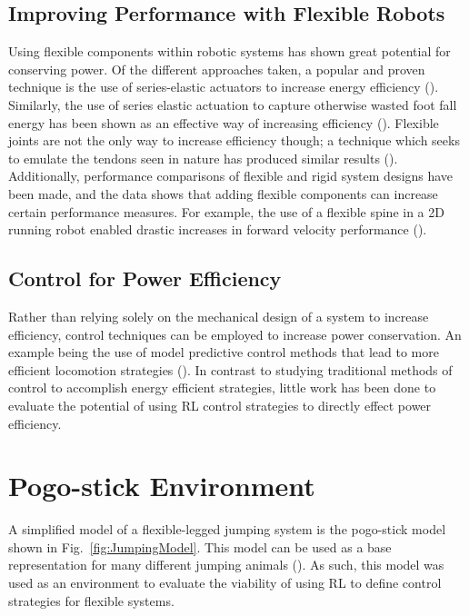 \documentclass{ifacconf}
\begin{document}
   \subsection{Improving Performance with Flexible Robots} 
      Using flexible components within robotic systems has shown great potential for conserving power. Of the different approaches taken, a popular and proven technique is the use of series-elastic actuators to increase energy efficiency (\cite{Pratt1995, Ahmadi1997}). Similarly, the use of series elastic actuation to capture otherwise wasted foot fall energy has been shown as an effective way of increasing efficiency (\cite{Seok2013, Seok2015}). Flexible joints are not the only way to increase efficiency though; a technique which seeks to emulate the tendons seen in nature has produced similar results (\cite{Folkertsma2012}). Additionally, performance comparisons of flexible and rigid system designs have been made, and the data shows that adding flexible components can increase certain performance measures. For example, the use of a flexible spine in a 2D running robot enabled drastic increases in forward velocity performance (\cite{Kani2013}). 
   
   \subsection{Control for Power Efficiency}
      Rather than relying solely on the mechanical design of a system to increase efficiency, control techniques can be employed to increase power conservation. An example being the use of model predictive control methods that lead to more efficient locomotion strategies (\cite{Harper2019}). In contrast to studying traditional methods of control to accomplish energy efficient strategies, little work has been done to evaluate the potential of using RL control strategies to directly effect power efficiency.
      
      
\section{Pogo-stick Environment}
   A simplified model of a flexible-legged jumping system is the pogo-stick model shown in Fig.~\ref{fig:JumpingModel}.  This model can be used as a base representation for many different jumping animals (\cite{Blickhan1993a}). As such, this model was used as an environment to evaluate the viability of using RL to define control strategies for flexible systems.
   
\end{document}
